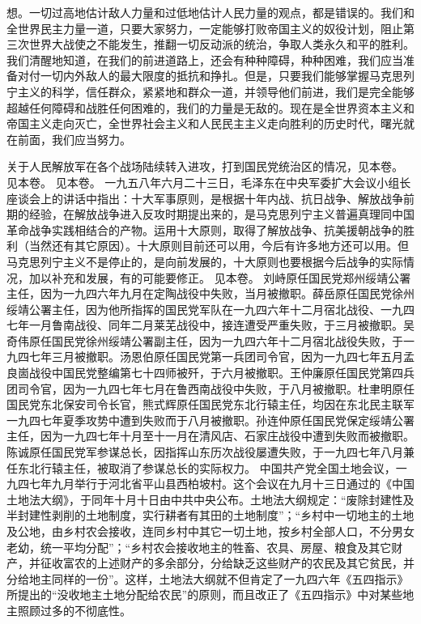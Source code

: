想。一切过高地估计敌人力量和过低地估计人民力量的观点，都是错误的。我们和全世界民主力量一道，只要大家努力，一定能够打败帝国主义的奴役计划，阻止第三次世界大战使之不能发生，推翻一切反动派的统治，争取人类永久和平的胜利。我们清醒地知道，在我们的前进道路上，还会有种种障碍，种种困难，我们应当准备对付一切内外敌人的最大限度的抵抗和挣扎。但是，只要我们能够掌握马克思列宁主义的科学，信任群众，紧紧地和群众一道，并领导他们前进，我们是完全能够超越任何障碍和战胜任何困难的，我们的力量是无敌的。现在是全世界资本主义和帝国主义走向灭亡，全世界社会主义和人民民主主义走向胜利的历史时代，曙光就在前面，我们应当努力。


\begin{maonote}
关于人民解放军在各个战场陆续转入进攻，打到国民党统治区的情况，见本卷。
见本卷。
见本卷。
一九五八年六月二十三日，毛泽东在中央军委扩大会议小组长座谈会上的讲话中指出：十大军事原则，是根据十年内战、抗日战争、解放战争前期的经验，在解放战争进入反攻时期提出来的，是马克思列宁主义普遍真理同中国革命战争实践相结合的产物。运用十大原则，取得了解放战争、抗美援朝战争的胜利（当然还有其它原因）。十大原则目前还可以用，今后有许多地方还可以用。但马克思列宁主义不是停止的，是向前发展的，十大原则也要根据今后战争的实际情况，加以补充和发展，有的可能要修正。
见本卷。
刘峙原任国民党郑州绥靖公署主任，因为一九四六年九月在定陶战役中失败，当月被撤职。薛岳原任国民党徐州绥靖公署主任，因为他所指挥的国民党军队在一九四六年十二月宿北战役、一九四七年一月鲁南战役、同年二月莱芜战役中，接连遭受严重失败，于三月被撤职。吴奇伟原任国民党徐州绥靖公署副主任，因为一九四六年十二月宿北战役失败，于一九四七年三月被撤职。汤恩伯原任国民党第一兵团司令官，因为一九四七年五月孟良崮战役中国民党整编第七十四师被歼，于六月被撤职。王仲廉原任国民党第四兵团司令官，因为一九四七年七月在鲁西南战役中失败，于八月被撤职。杜聿明原任国民党东北保安司令长官，熊式辉原任国民党东北行辕主任，均因在东北民主联军一九四七年夏季攻势中遭到失败而于八月被撤职。孙连仲原任国民党保定绥靖公署主任，因为一九四七年十月至十一月在清风店、石家庄战役中遭到失败而被撤职。陈诚原任国民党军参谋总长，因指挥山东历次战役屡遭失败，于一九四七年八月兼任东北行辕主任，被取消了参谋总长的实际权力。
中国共产党全国土地会议，一九四七年九月举行于河北省平山县西柏坡村。这个会议在九月十三日通过的《中国土地法大纲》，于同年十月十日由中共中央公布。土地法大纲规定：“废除封建性及半封建性剥削的土地制度，实行耕者有其田的土地制度”；“乡村中一切地主的土地及公地，由乡村农会接收，连同乡村中其它一切土地，按乡村全部人口，不分男女老幼，统一平均分配”；“乡村农会接收地主的牲畜、农具、房屋、粮食及其它财产，并征收富农的上述财产的多余部分，分给缺乏这些财产的农民及其它贫民，并分给地主同样的一份”。这样，土地法大纲就不但肯定了一九四六年《五四指示》所提出的“没收地主土地分配给农民”的原则，而且改正了《五四指示》中对某些地主照顾过多的不彻底性。

\end{maonote}

